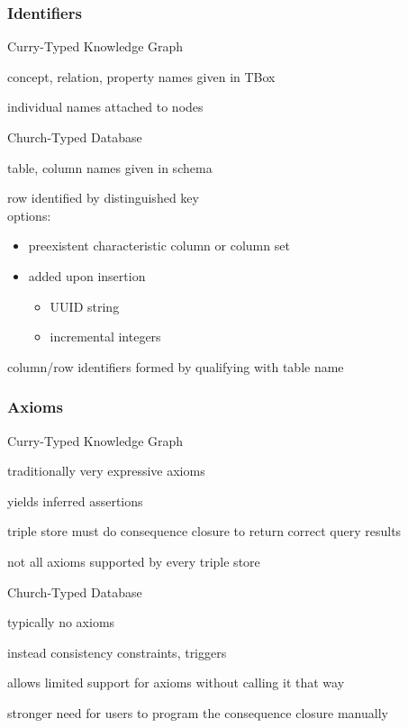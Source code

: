 \begin{frame}\frametitle{Identifiers}
\begin{blockitems}{Curry-Typed Knowledge Graph}
\item concept, relation, property names given in TBox
\item individual names attached to nodes
\end{blockitems}

\begin{blockitems}{Church-Typed Database}
\item table, column names given in schema
\item row identified by distinguished key\\[0.4em]
options:
 \begin{itemize}
 \item preexistent characteristic column or column set
 \item added upon insertion
  \begin{itemize}
  \item UUID string
  \item incremental integers
  \end{itemize} 
 \end{itemize}
\item column/row identifiers formed by qualifying with table name
\end{blockitems}
\end{frame}

\begin{frame}\frametitle{Axioms}
\begin{blockitems}{Curry-Typed Knowledge Graph}
\item traditionally very expressive axioms
\item yields inferred assertions
\item triple store must do consequence closure to return correct query results
\item not all axioms supported by every triple store
\end{blockitems}

\begin{blockitems}{Church-Typed Database}
\item typically no axioms
\item instead consistency constraints, triggers
\item allows limited support for axioms without calling it that way
\item stronger need for users to program the consequence closure manually
\end{blockitems}
\end{frame}


